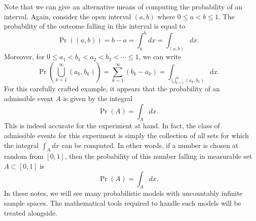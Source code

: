 Note that we can give an alternative means of computing the probability of an interval.
Again, consider the open interval $(a, b)$ where $0 \leq a < b \leq 1$.
The probability of the outcome falling in this  interval is equal to
\begin{equation*}
\Pr ( (a, b) ) = b - a = \int_a^b dx = \int_{(a,b)} dx .
\end{equation*}
Moreover, for $0 \leq a_1 < b_1 < a_2 < b_2 < \cdots \leq 1$, we can write
\begin{equation*}
\Pr \left( \bigcup_{k=1}^{\infty} (a_k,b_k) \right)
= \sum_{k=1}^{\infty} \left( b_k - a_k \right)
= \int_{\bigcup_{k=1}^{\infty} (a_k,b_k)} dx .
\end{equation*}
For this carefully crafted example, it appears that the probability of an admissible event $A$ is given by the integral
\begin{equation*}
\Pr (A) = \int_{A} dx .
\end{equation*}
This is indeed accurate for the experiment at hand.
In fact, the class of admissible events for this experiment is simply the collection of all sets for which the integral $\int_A dx$ can be computed.
In other words, if a number is chosen at random from $[0,1]$, then the probability of this number falling in measurable set $A \subset [0,1]$ is
\begin{equation*}
\Pr (A) = \int_{A} dx .
\end{equation*}
In these notes, we will see many probabilistic models with uncountably infinite sample spaces.
The mathematical tools required to handle such models will be treated alongside.

